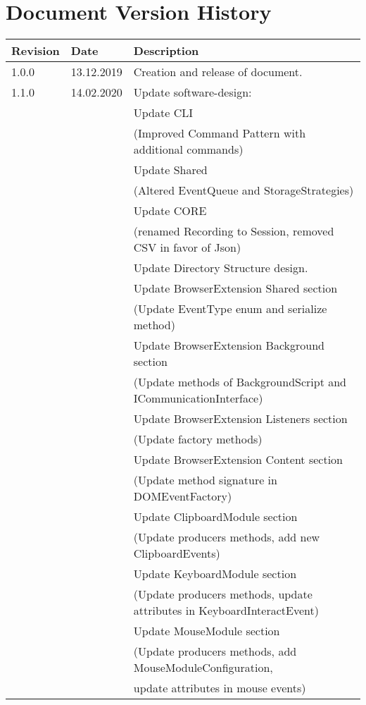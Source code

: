 \chapter*{Document Version History}
\label{ch:versionhistory}
\begin{table}[h]
\begin{tabular}{lll}
\textbf{Revision} & \textbf{Date} & \textbf{Description}              \\
\hline
1.0.0             & 13.12.2019    & Creation and release of document. \\
\hline
1.1.0			  & 14.02.2020	  & Update software-design: \\
&& Update CLI \\
&& (Improved Command Pattern with additional commands) \\
&& Update Shared \\
&& (Altered EventQueue and StorageStrategies) \\
&& Update CORE \\
&& (renamed Recording to Session, removed CSV in favor of Json) \\
&& Update Directory Structure design. \\                                                          
&& Update BrowserExtension Shared section\\
&& (Update EventType enum and serialize method)\\
&& Update BrowserExtension Background section\\
&& (Update methods of BackgroundScript and ICommunicationInterface)\\
&& Update BrowserExtension Listeners section\\
&& (Update factory methods)\\
&& Update BrowserExtension Content section\\
&& (Update method signature in DOMEventFactory)\\
&& Update ClipboardModule section\\
&& (Update producers methods, add new ClipboardEvents)\\
&& Update KeyboardModule section\\
&& (Update producers methods, update attributes in KeyboardInteractEvent)\\
&& Update MouseModule section\\
&& (Update producers methods, add MouseModuleConfiguration,\\
&& update attributes in mouse events)\\

\end{tabular}
\end{table}

